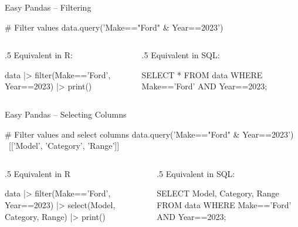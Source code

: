 \documentclass[ignorenonframetext,xcolor=x11names]{beamer}
\begin{document}
\begin{frame}[label=full,fragile]{Easy Pandas -- Filtering}
\begin{pythoncode}
# Filter values
data.query('Make=="Ford" & Year==2023')
\end{pythoncode}

\vspace{\baselineskip}
\begin{columns}
\begin{column}{.5\textwidth}
Equivalent in R:
\begin{Rcode}
data |> 
  filter(Make=='Ford', 
         Year==2023) |> 
  print()
\end{Rcode}
\end{column}
\begin{column}{.5\textwidth}
Equivalent in SQL:
\begin{sqlcode}
SELECT * 
   FROM data 
   WHERE Make=='Ford' AND 
         Year==2023;
\end{sqlcode}
\end{column}
\end{columns}
\end{frame}

\begin{frame}[label=full,fragile]{Easy Pandas -- Selecting Columns}

\begin{pythoncode}
# Filter values and select columns
data.query('Make=="Ford" & Year==2023') \
    [['Model', 'Category', 'Range']]
\end{pythoncode}

\vspace{\baselineskip}

\begin{columns}
\begin{column}{.5\textwidth}
Equivalent in R
\begin{Rcode}
data |> 
  filter(Make=='Ford', 
         Year==2023) |> 
  select(Model, Category, 
            Range) |>
  print()
\end{Rcode}
\end{column}
\begin{column}{.5\textwidth}
Equivalent in SQL:

\begin{sqlcode}
SELECT Model, Category, Range 
   FROM data 
   WHERE Make=='Ford' AND 
         Year==2023;
\end{sqlcode}
\end{column}
\end{columns}
\end{frame}
\end{document}
